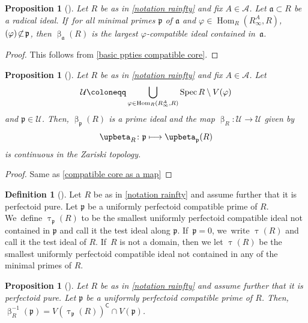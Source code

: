 \documentclass[JEP,XML,SOM,Unicode,published]{cedram}
\let\autoref\cref
\newcommand\mto{\mathchoice{\longmapsto}{\mapsto}{\mapsto}{\mapsto}}
\theoremstyle{plain}
\newtheorem{proposition}[theorem]{Proposition}
\theoremstyle{definition}
\newtheorem{definition}[theorem]{Definition}
\numberwithin{equation}{theorem}
\newcommand{\fra}{\mathfrak{a}}
\newcommand{\p}{\mathfrak{p}}
\DeclareMathOperator{\Hom}{Hom}
\let\Im\relax
\DeclareMathOperator{\Im}{Im}
\DeclareMathOperator{\Spec}{{Spec}}
\newcommand{\nsubset}{\not\subset}
\newcommand{\sA}{\mathcal{A}}
\newcommand{\sU}{\mathcal{U}}
\renewcommand{\phi}{\varphi}
\newcommand{\inv}{^{-1}}
\newcommand{\rafty}{R^A_\infty}
\begin{document}
\begin{proposition}[{\cf \cite[Cor.\,3.14]{BrosowskyCartierCoreMap}}]
Let $R$ be as in \autoref{notation rainfty} and fix $A\in \sA$. Let $\fra\subset R$ be a radical ideal. If~for all minimal primes $\p$ of $\fra$ and $\phi\in \Hom_R\left(\rafty,R\right)$, $\Im(\phi)\!\nsubset\! \p$, then
$\upbeta_\fra(R)$ is the largest $\phi$-compatible ideal contained in~$\fra$.
\end{proposition}

\begin{proof}
This follows from \autoref{basic ppties compatible core}.
\end{proof}

\begin{proposition}[{\cf \cite[Th.\,3.3]{BrosowskyCartierCoreMap}}]
Let $R$ be as in \autoref{notation rainfty} and fix $A\in \sA$. Let
\[
\sU\coloneqq \bigcup_{\phi\in \Hom_R\left(\rafty,R\right)} \Spec R\setminus V(\Im\phi)
\]
and $\p\in \sU$.
Then, $\upbeta_\p(R)$ is a prime ideal and the map $\upbeta_{R}\colon \sU \to \sU$ given by
\[
\upbeta_{R}\colon \p \mto \upbeta_\p(R)
\]
is continuous in the Zariski topology.
\end{proposition}

\begin{proof}
Same as \autoref{compatible core as a map}
\end{proof}

\begin{definition}[{\cf \cite{TakagiHigherDimensionalAdjoint, SmolkinSubadditivity}}]
Let $R$ be as in \autoref{notation rainfty} and assume further that it is perfectoid pure. Let $\p$ be a uniformly perfectoid compatible prime of $R$. We~define $\uptau_\p(R)$ to be the smallest uniformly perfectoid compatible ideal not contained in $\p$ and call it the test ideal along $\p$. If~$\p=0$, we~write $\uptau(R)$ and call it the test ideal of $R$. If~$R$ is not a domain, then we let $\uptau(R)$ be the smallest uniformly perfectoid compatible ideal not contained in any of the minimal primes of $R$.
\end{definition}

\begin{proposition}[{\cf \cite[Prop.\,4.20]{CarvajalFayolleTameRamificationCFPS}}]\label{fibers of beta are tau}
Let $R$ be as in \autoref{notation rainfty} and assume further that it is perfectoid pure. Let $\p$ be a uniformly perfectoid compatible prime of $R$. Then, $\upbeta\inv_{R}(\p)=V(\uptau_\p(R))^\mathsf{C}\cap V(\p)$.
\end{proposition}
\end{document}
